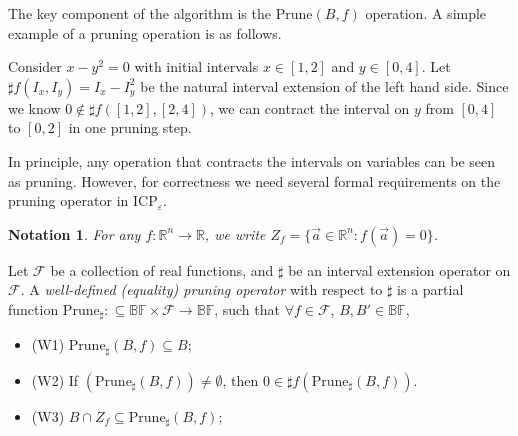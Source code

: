 \documentclass[prodmode]{acmsmall} %
\newtheorem{notation}[theorem]{Notation}
\begin{document}
The key component of the algorithm is the $\mathrm{Prune}(B, f)$ operation. A simple example of a pruning operation is as follows.
\begin{example}
Consider $x-y^2 = 0$ with initial intervals $x\in [1,2]$ and $y\in [0,4]$. Let $\sharp f(I_x,I_y) = I_x-I_y^2$ be the natural interval extension of the left hand side. Since we know $0\not\in \sharp f([1,2],[2, 4])$, we can contract the interval on $y$ from $[0,4]$ to $[0,2]$ in one pruning step.  
\end{example}
In principle, any operation that contracts the intervals on variables can be seen as pruning. However, for correctness we need several formal requirements on the pruning operator in ICP$_{\varepsilon}$. 
\begin{notation}
For any $f:\mathbb{R}^n\rightarrow \mathbb{R}$, we write $Z_f=\{\vec a\in \mathbb{R}^n: f(\vec a)=0\}$.
\end{notation}
\begin{definition}\label{well}
Let $\mathcal{F}$ be a collection of real functions, and $\sharp$ be an interval extension operator on $\mathcal{F}$. A {\em well-defined (equality) pruning operator} with respect to $\sharp$ is a partial function $\mathrm{Prune}_{\sharp} : \subseteq \mathbb{BF}\times \mathcal{F}\rightarrow \mathbb{BF}$, such that $\forall f\in \mathcal{F}$, $B,B'\in \mathbb{BF}$, 
\begin{itemize}
\item (W1) $\mathrm{Prune}_{\sharp}(B, f)\subseteq B$;
\item (W2) If $(\mathrm{Prune}_{\sharp}(B,f))\neq \emptyset$, then $0\in \sharp f(\mathrm{Prune}_{\sharp}(B,f))$. 
\item (W3) $B \cap Z_f \subseteq \mathrm{Prune}_{\sharp}(B, f)$;
\end{itemize}
\end{definition}
\end{document}
